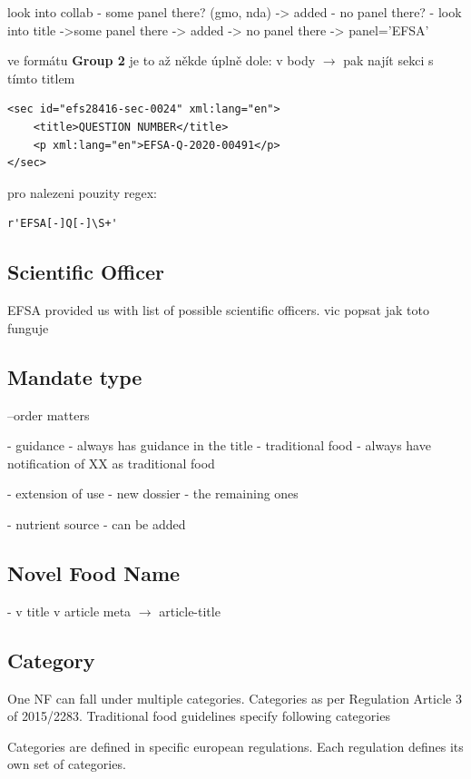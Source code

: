 \documentclass[12pt]{article}
\begin{document}
look into collab - some panel there? (gmo, nda) -> added
                - no panel there?
                    - look into title ->some panel there -> added
                                        -> no panel there -> panel='EFSA'

ve formátu \textbf{Group 2} je to až někde úplně dole:
v body $\rightarrow$ pak najít sekci s tímto titlem

\lstset{language=XML}
\begin{lstlisting}
<sec id="efs28416-sec-0024" xml:lang="en">
    <title>QUESTION NUMBER</title>
    <p xml:lang="en">EFSA-Q-2020-00491</p>
</sec>
\end{lstlisting}

pro nalezeni pouzity regex: 
\lstset{language=Python}
\begin{lstlisting}
r'EFSA[-]Q[-]\S+'
\end{lstlisting}

\subsection{Scientific Officer}
EFSA provided us with list of possible scientific officers.
vic popsat jak toto funguje


\subsection{Mandate type}
--order matters

- guidance - always has guidance in the title
- traditional food - always have notification of XX as traditional food

- extension of use
- new dossier - the remaining ones


- nutrient source - can be added

\subsection{Novel Food Name}
- v title v article meta $\rightarrow$ article-title

\subsection{Category}
One NF can fall under multiple categories.
Categories as per Regulation Article 3 of 2015/2283.
Traditional food guidelines specify following categories

Categories are defined in specific european regulations. Each regulation defines its own set of categories.
\end{document}
